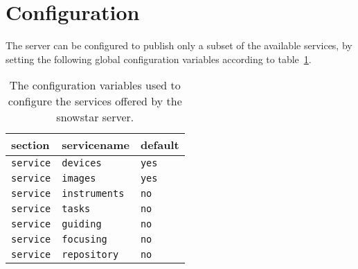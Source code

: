 \section{Configuration}
The server can be configured to publish only a subset of the available
services, by setting the following global configuration variables according
to table~\ref{snowstar:configuration:table}.
\begin{table}
\centering
\begin{tabular}{lll}
section         &servicename         &default     \\
\hline
\texttt{service}&\texttt{devices}    &\texttt{yes}\\
\texttt{service}&\texttt{images}     &\texttt{yes}\\
\texttt{service}&\texttt{instruments}&\texttt{no} \\
\texttt{service}&\texttt{tasks}      &\texttt{no} \\
\texttt{service}&\texttt{guiding}    &\texttt{no} \\
\texttt{service}&\texttt{focusing}   &\texttt{no} \\
\texttt{service}&\texttt{repository} &\texttt{no} \\
\hline
\end{tabular}
\caption{The configuration variables used to configure the services
offered by the snowstar server.
\label{snowstar:configuration:table}}
\end{table}





